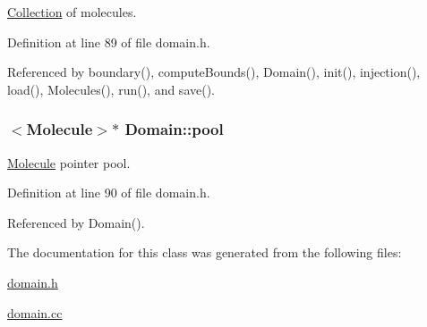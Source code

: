 \hyperlink{classCollection}{Collection} of molecules. 



Definition at line 89 of file domain.h.

Referenced by boundary(), computeBounds(), Domain(), init(), injection(), load(), Molecules(), run(), and save().\hypertarget{classDomain_270c6f9b44dde16bd8a993f9dd6e63ba}{
\subsubsection[{pool}]{$<${\bf Molecule}$>$$\ast$ {\bf Domain::pool}}}
\label{classDomain_270c6f9b44dde16bd8a993f9dd6e63ba}


\hyperlink{classMolecule}{Molecule} pointer pool. 



Definition at line 90 of file domain.h.

Referenced by Domain().

The documentation for this class was generated from the following files:\begin{CompactItemize}
\item 
\hyperlink{domain_8h}{domain.h}\item 
\hyperlink{domain_8cc}{domain.cc}\end{CompactItemize}
